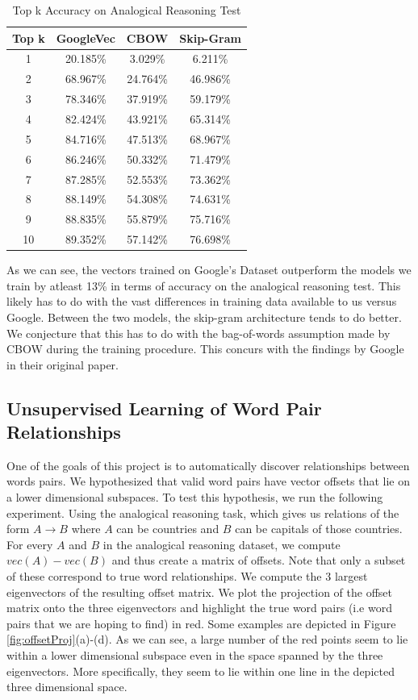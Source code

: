 \documentclass[11pt]{article}
\begin{document}
\begin{table}[h]
	\caption{Top k Accuracy on Analogical Reasoning Test}
	\label{tab:AnalogicalAcc}
	\centering
    \begin{tabular}{| c | c | c | c |}
    \hline
    \textbf{Top k} & \textbf{GoogleVec} & \textbf{CBOW} & \textbf{Skip-Gram}\\ \hline
    1 & 20.185\% & 3.029\% & 6.211\%  \\ \hline
    2 & 68.967\% & 24.764\%& 46.986\% \\ \hline
    3 & 78.346\% & 37.919\%& 59.179\% \\ \hline
    4 & 82.424\% & 43.921\%& 65.314\% \\ \hline
    5 & 84.716\% & 47.513\%& 68.967\% \\ \hline
    6 & 86.246\% & 50.332\%& 71.479\% \\ \hline
    7 & 87.285\% & 52.553\%& 73.362\% \\ \hline
    8 & 88.149\% & 54.308\%& 74.631\% \\ \hline
    9 & 88.835\% & 55.879\%& 75.716\% \\ \hline
    10 & 89.352\% & 57.142\%& 76.698\% \\ \hline
    \end{tabular}
\end{table}

As we can see, the vectors trained on Google's Dataset outperform the models we train by atleast 13\% in terms of accuracy on the analogical reasoning test. This likely has to do with the vast differences in training data available to us versus Google. Between the two models, the skip-gram architecture tends to do better. We conjecture that this has to do with the bag-of-words assumption made by CBOW during the training procedure. This concurs with the findings by Google in their original paper. 

\subsection{Unsupervised Learning of Word Pair Relationships}
One of the goals of this project is to automatically discover relationships between words pairs. We hypothesized that valid word pairs have vector offsets that lie on a lower dimensional subspaces. To test this hypothesis, we run the following experiment. Using the analogical reasoning task, which gives us relations of the form $A\to B$ where $A$ can be countries and $B$ can be capitals of those countries. For every $A$ and $B$ in the analogical reasoning dataset, we compute $vec(A)-vec(B)$ and thus create a matrix of offsets. Note that only a subset of these correspond to true word relationships. We compute the $3$ largest eigenvectors of the resulting offset matrix. We plot the projection of the offset matrix onto the three eigenvectors and highlight the true word pairs (i.e word pairs that we are hoping to find) in red. Some examples are depicted in Figure \ref{fig:offsetProj}(a)-(d). As we can see, a large number of the red points seem to lie within a lower dimensional subspace even in the space spanned by the three eigenvectors. More specifically, they seem to lie within one line in the depicted three dimensional space. 
\end{document}
